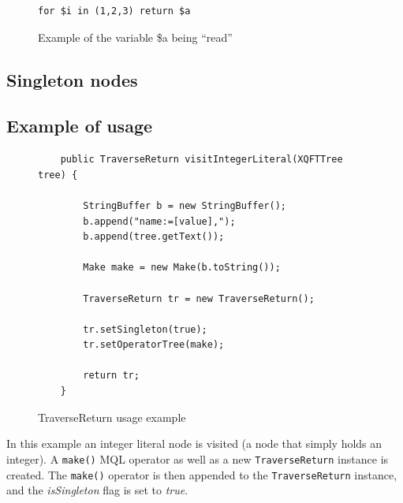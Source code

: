 \begin{figure}[!htp]
\begin{center}
\begin{Verbatim}
for $i in (1,2,3) return $a
\end{Verbatim}
  \caption{Example of the variable \$a being ``read''}
  \label{fig:impl:meta:var_ref_ex}
\end{center}
\end{figure}

\subsection{Singleton nodes}

\subsection{Example of usage}

\begin{figure}[!htp]
\begin{center}
\begin{Verbatim}
    public TraverseReturn visitIntegerLiteral(XQFTTree tree) {

        StringBuffer b = new StringBuffer();
        b.append("name:=[value],");
        b.append(tree.getText());
        
        Make make = new Make(b.toString());

        TraverseReturn tr = new TraverseReturn();
        
        tr.setSingleton(true);
        tr.setOperatorTree(make);

        return tr;
    }
\end{Verbatim}
  \caption{TraverseReturn usage example}
  \label{fig:impl:meta:traverse_usage_ex}
\end{center}
\end{figure}

In this example an integer literal node is visited (a node that simply holds an
integer). A \texttt{make()} MQL operator as well as a new
\texttt{TraverseReturn} instance is created. The \texttt{make()} operator is
then appended to the \texttt{TraverseReturn} instance, and the
\textit{isSingleton} flag is set to \textit{true}.